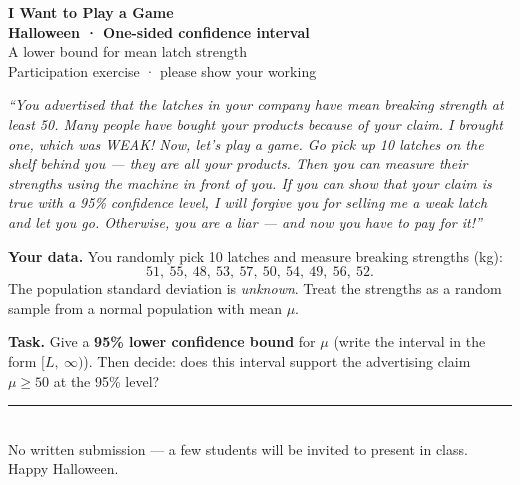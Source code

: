 \documentclass[11pt,a4paper,UTF8]{ctexart}
\begin{document}
\begin{center}
  {\Large\bfseries\color{blood} I Want to Play a Game}\\[0.25em]
  {\large\bfseries Halloween · One-sided confidence interval}\\[0.55em]
  {\normalsize A lower bound for mean latch strength}\\[0.7em]
  {\small Participation exercise · please show your working}
\end{center}

\vspace{0.35em}

\begin{tcolorbox}[
  enhanced,
  colback=paper,
  colframe=blood,
  boxrule=1.1pt,
  arc=2mm,
  left=10pt,right=10pt,top=8pt,bottom=8pt,
  title={\bfseries Jigsaw's message},
  fonttitle=\color{white}\bfseries,
  coltitle=white,
  colbacktitle=blood
]
\textit{``You advertised that the latches in your company have mean breaking strength at least 50.
Many people have bought your products because of your claim.
I brought one, which was WEAK!
Now, let's play a game.
Go pick up 10 latches on the shelf behind you --- they are all your products.
Then you can measure their strengths using the machine in front of you.
If you can show that your claim is true with a 95\% confidence level, I will forgive you for selling me a weak latch and let you go.
Otherwise, you are a liar --- and now you have to pay for it!''}
\end{tcolorbox}

\vspace{0.75em}

\noindent\textbf{Your data.}
You randomly pick 10 latches and measure breaking strengths (kg):
\[
51,\ 55,\ 48,\ 53,\ 57,\ 50,\ 54,\ 49,\ 56,\ 52.
\]
The population standard deviation is \emph{unknown}. Treat the strengths as a random sample from a normal population with mean $\mu$.

\vspace{0.65em}

\noindent\textbf{Task.}
Give a \textbf{95\% lower confidence bound} for $\mu$ (write the interval in the form $[L,\ \infty)$).
Then decide: does this interval support the advertising claim $\mu\ge 50$ at the 95\% level?

\vspace{0.85em}
\noindent\rule{\textwidth}{0.4pt}\\[0.55em]
{\small
No written submission --- a few students will be invited to present in class.
Happy Halloween.
}
\end{document}
